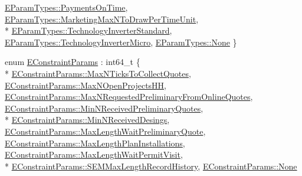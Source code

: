 \begin{DoxyCompactItemize}
\hyperlink{namespacesolar__core_aa1147341e5ef7a40d68d1bd68e149362a7863d48ef49981916e8a483f2171b306}{E\+Param\+Types\+::\+Payments\+On\+Time}, 
\hyperlink{namespacesolar__core_aa1147341e5ef7a40d68d1bd68e149362a56319e8e21c87c38fb797f23a73f5fe3}{E\+Param\+Types\+::\+Marketing\+Max\+N\+To\+Draw\+Per\+Time\+Unit}, 
\\*
\hyperlink{namespacesolar__core_aa1147341e5ef7a40d68d1bd68e149362a1a190aa7a38d2e8a842cd07e17dfac09}{E\+Param\+Types\+::\+Technology\+Inverter\+Standard}, 
\hyperlink{namespacesolar__core_aa1147341e5ef7a40d68d1bd68e149362acff31f4237035a33c80d603fd67f6abd}{E\+Param\+Types\+::\+Technology\+Inverter\+Micro}, 
\hyperlink{namespacesolar__core_aa1147341e5ef7a40d68d1bd68e149362a6adf97f83acf6453d4a6a4b1070f3754}{E\+Param\+Types\+::\+None}
 \}
\item 
enum \hyperlink{namespacesolar__core_ac827fdef4412a3c0d5e44d3f31908e49}{E\+Constraint\+Params} \+: int64\+\_\+t \{ \\*
\hyperlink{namespacesolar__core_ac827fdef4412a3c0d5e44d3f31908e49a79b059203dc39b55d85046f355d1fa95}{E\+Constraint\+Params\+::\+Max\+N\+Ticks\+To\+Collect\+Quotes}, 
\hyperlink{namespacesolar__core_ac827fdef4412a3c0d5e44d3f31908e49a5d0891420ec7c6769c9ece305c98daac}{E\+Constraint\+Params\+::\+Max\+N\+Open\+Projects\+H\+H}, 
\hyperlink{namespacesolar__core_ac827fdef4412a3c0d5e44d3f31908e49ae497930a8f22e14387bac31ebe737a64}{E\+Constraint\+Params\+::\+Max\+N\+Requested\+Preliminary\+From\+Online\+Quotes}, 
\hyperlink{namespacesolar__core_ac827fdef4412a3c0d5e44d3f31908e49a2e66c9bd577b41e92fd40c619a886559}{E\+Constraint\+Params\+::\+Min\+N\+Received\+Preliminary\+Quotes}, 
\\*
\hyperlink{namespacesolar__core_ac827fdef4412a3c0d5e44d3f31908e49a177186685b2d9651d26b48cb4ad61cc6}{E\+Constraint\+Params\+::\+Min\+N\+Received\+Desings}, 
\hyperlink{namespacesolar__core_ac827fdef4412a3c0d5e44d3f31908e49aa27f1df5083a611e423ed8531aad5cd3}{E\+Constraint\+Params\+::\+Max\+Length\+Wait\+Preliminary\+Quote}, 
\hyperlink{namespacesolar__core_ac827fdef4412a3c0d5e44d3f31908e49a343e282b2f49a70e6df068f1bca38402}{E\+Constraint\+Params\+::\+Max\+Length\+Plan\+Installations}, 
\hyperlink{namespacesolar__core_ac827fdef4412a3c0d5e44d3f31908e49a8c0f94b4a281d1e2221b3160596f4283}{E\+Constraint\+Params\+::\+Max\+Length\+Wait\+Permit\+Visit}, 
\\*
\hyperlink{namespacesolar__core_ac827fdef4412a3c0d5e44d3f31908e49ac75cfee3c5e5c1d3c4b15f53ab4cc718}{E\+Constraint\+Params\+::\+S\+E\+M\+Max\+Length\+Record\+History}, 
\hyperlink{namespacesolar__core_ac827fdef4412a3c0d5e44d3f31908e49a6adf97f83acf6453d4a6a4b1070f3754}{E\+Constraint\+Params\+::\+None}

\end{DoxyCompactItemize}
